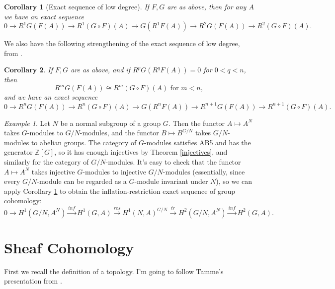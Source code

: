 \documentclass[letterpaper,11pt]{article}
\newtheorem{cor}{Corollary}
\theoremstyle{definition}
\theoremstyle{remark}
\newtheorem{ex}{Example}
\begin{document}
\begin{cor}[Exact sequence of low degree]\label{five-term} If $F,G$ are as above, then for any $A$ we have an exact sequence
\[
0 \rightarrow R^1G(F(A)) \rightarrow R^1(G\circ F)(A) \rightarrow G(R^1F(A)) \rightarrow R^2G(F(A)) \rightarrow R^2(G\circ F)(A).
\]
\end{cor}

We also have the following strengthening of the exact sequence of low degree, from \cite{etale}.

\begin{cor}\label{degenerate} If $F,G$ are as above, and if $R^pG(R^qF(A)) = 0$ for $0 < q < n$, then
\[
R^mG(F(A)) \cong R^m(G\circ F)(A) \mbox{ for } m < n,
\]
and we have an exact sequence
\[
0 \rightarrow R^nG(F(A)) \rightarrow R^n(G\circ F)(A) \rightarrow G(R^nF(A)) \rightarrow R^{n+1}G(F(A)) \rightarrow R^{n+1}(G\circ F)(A).
\]
\end{cor}

\begin{ex} Let $N$ be a normal subgroup of a group $G$. Then the functor $A \mapsto A^N$ takes $G$-modules to $G/N$-modules, and the functor $B \mapsto B^{G/N}$ takes $G/N$-modules to abelian groups. The category of $G$-modules satisfies AB5 and has the generator $\mathbb{Z}[G]$, so it has enough injectives by Theorem \ref{injectives}, and similarly for the category of $G/N$-modules. It's easy to check that the functor $A \mapsto A^N$ takes injective $G$-modules to injective $G/N$-modules (essentially, since every $G/N$-module can be regarded as a $G$-module invariant under $N$), so we can apply Corollary \ref{five-term} to obtain the inflation-restriction exact sequence of group cohomology:
\[
0 \rightarrow H^1(G/N,A^N) \stackrel{inf}{\longrightarrow} H^1(G,A) \stackrel{res}{\longrightarrow} H^1(N,A)^{G/N} \stackrel{tr}{\longrightarrow} H^2(G/N,A^N) \stackrel{inf}{\longrightarrow} H^2(G,A).
\]
\end{ex}

\section{Sheaf Cohomology}

First we recall the definition of a topology. I'm going to follow Tamme's presentation from \cite{etale}.
\end{document}
